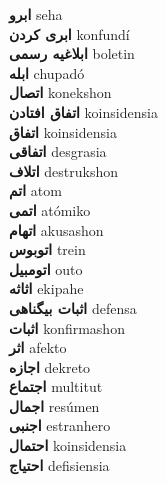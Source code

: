 \textbf{ ابرو  } seha \\
\textbf{ ابری کردن  } konfundí \\
\textbf{ ابلاغیه رسمی  } boletin \\
\textbf{ ابله  } chupadó \\
\textbf{ اتصال  } konekshon \\
\textbf{ اتفاق افتادن  } koinsidensia \\
\textbf{ اتفاق  } koinsidensia \\
\textbf{ اتفاقی  } desgrasia \\
\textbf{ اتلاف  } destrukshon \\
\textbf{ اتم  } atom \\
\textbf{ اتمی  } atómiko \\
\textbf{ اتهام  } akusashon \\
\textbf{ اتوبوس  } trein \\
\textbf{ اتومبیل  } outo \\
\textbf{ اثاثه  } ekipahe \\
\textbf{ اثبات بیگناهی  } defensa \\
\textbf{ اثبات  } konfirmashon \\
\textbf{ اثر  } afekto \\
\textbf{ اجازه  } dekreto \\
\textbf{ اجتماع  } multitut \\
\textbf{ اجمال  } resúmen \\
\textbf{ اجنبی  } estranhero \\
\textbf{ احتمال  } koinsidensia \\
\textbf{ احتیاج  } defisiensia \\
